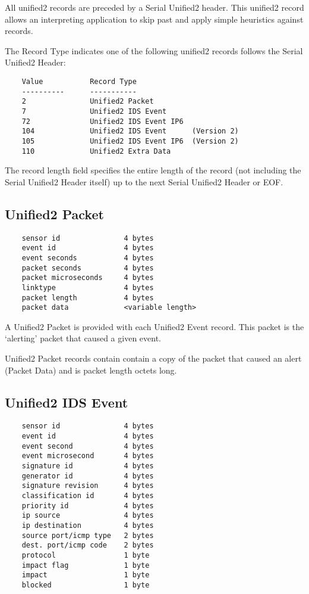 \documentclass[english]{report}
\begin{document}
  All unified2 records are preceded by a Serial Unified2 header.  This
  unified2 record allows an interpreting application to skip past and
  apply simple heuristics against records.
  
  The Record Type indicates one of the following unified2 records
  follows the Serial Unified2 Header:

\begin{verbatim}
    Value           Record Type
    ----------      -----------
    2               Unified2 Packet
    7               Unified2 IDS Event
    72              Unified2 IDS Event IP6
    104             Unified2 IDS Event      (Version 2)
    105             Unified2 IDS Event IP6  (Version 2)
    110             Unified2 Extra Data
\end{verbatim}

  The record length field specifies the entire length of the record 
  (not including the Serial Unified2 Header itself) up to the next 
  Serial Unified2 Header or EOF.

\subsection{Unified2 Packet}
 
\begin{verbatim}
    sensor id               4 bytes
    event id                4 bytes
    event seconds           4 bytes
    packet seconds          4 bytes
    packet microseconds     4 bytes
    linktype                4 bytes
    packet length           4 bytes
    packet data             <variable length>
\end{verbatim}

  A Unified2 Packet is provided with each Unified2 Event record. This
  packet is the `alerting' packet that caused a given event.

  Unified2 Packet records contain contain a copy of the packet that
  caused an alert (Packet Data) and is packet length octets long.

\subsection{Unified2 IDS Event}

\begin{verbatim}
    sensor id               4 bytes
    event id                4 bytes
    event second            4 bytes
    event microsecond       4 bytes
    signature id            4 bytes
    generator id            4 bytes
    signature revision      4 bytes
    classification id       4 bytes
    priority id             4 bytes
    ip source               4 bytes
    ip destination          4 bytes
    source port/icmp type   2 bytes
    dest. port/icmp code    2 bytes
    protocol                1 byte
    impact flag             1 byte
    impact                  1 byte
    blocked                 1 byte
\end{verbatim}
\end{document}
